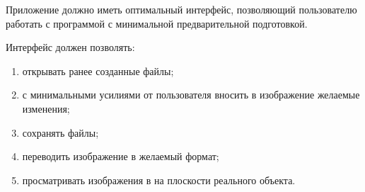 Приложение должно иметь оптимальный интерфейс, позволяющий пользователю работать с программой с минимальной предварительной подготовкой. 

Интерфейс должен позволять:
\begin{enumerate}
    \item открывать ранее созданные файлы;
    \item с минимальными усилиями от пользователя вносить в изображение желаемые изменения;
    \item сохранять файлы;
    \item переводить изображение в желаемый формат;
    \item просматривать изображения в на плоскости реального объекта.
\end{enumerate}